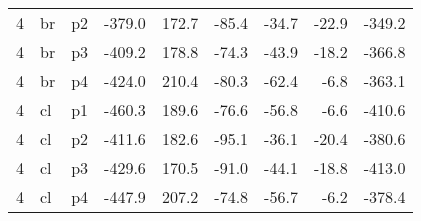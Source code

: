\documentclass[a4paper]{article}
\begin{document}
\begin{table}[ht]
\begin{tabular}{rllrrrrrr}
   4 & br & p2 & -379.0 & 172.7 & -85.4 & -34.7 & -22.9 & -349.2 \\ 
   4 & br & p3 & -409.2 & 178.8 & -74.3 & -43.9 & -18.2 & -366.8 \\ 
   4 & br & p4 & -424.0 & 210.4 & -80.3 & -62.4 & -6.8 & -363.1 \\ 
   4 & cl & p1 & -460.3 & 189.6 & -76.6 & -56.8 & -6.6 & -410.6 \\ 
   4 & cl & p2 & -411.6 & 182.6 & -95.1 & -36.1 & -20.4 & -380.6 \\ 
   4 & cl & p3 & -429.6 & 170.5 & -91.0 & -44.1 & -18.8 & -413.0 \\ 
   4 & cl & p4 & -447.9 & 207.2 & -74.8 & -56.7 & -6.2 & -378.4 \\ 
   \hline
\end{tabular}
\end{table}
\end{document}
